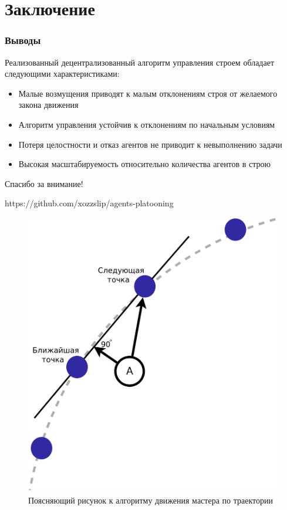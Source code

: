 \documentclass[10pt]{beamer}
\begin{document}
\section{Заключение}
\begin{frame}
	\frametitle{Выводы}
	Реализованный децентрализованный алгоритм управления строем обладает следующими характеристиками:
	\begin{itemize}
		\item Малые возмущения приводят к малым отклонениям строя от желаемого закона движения
		\item Алгоритм управления устойчив к отклонениям по начальным условиям
		\item Потеря целостности и отказ агентов не приводит к невыполнению задачи
		\item Высокая масштабируемость относительно количества агентов в строю  
	\end{itemize}
\end{frame}
\begin{frame}
	
  \begin{minipage}[t][.8\textheight]{\textwidth}
  	\vspace{3cm}
	\begin{center}
		\large Спасибо за внимание!
	\end{center}
	
	\vfill
	
    \footnotesize https://github.com/xozzslip/agents-platooning
\end{minipage}
\end{frame}

\begin{frame}[noframenumbering]
\begin{figure}
	\centering
	\includegraphics[width=0.6\linewidth]{others/master-alg}
	\caption{Поясняющий рисунок к алгоритму движения мастера по траектории}
	\label{fig:master-alg}
\end{figure}
\end{frame}
\end{document}
